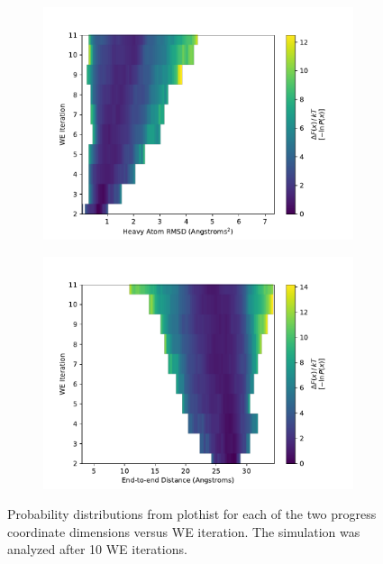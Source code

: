 \documentclass[9pt,tutorial]{livecoms}
\begin{document}
\begin{figure}
\centering
\begin{subfigure}[A]{0.22\textwidth}
\includegraphics[width=\linewidth]{Figure6A.pdf}
\end{subfigure}
\begin{subfigure}[B]{0.22\textwidth}
\includegraphics[width=\linewidth]{Figure6B.pdf}
\end{subfigure}
\caption{Probability distributions from plothist for each of the two progress coordinate dimensions versus WE iteration. 
The simulation was analyzed after 10 WE iterations.}
\label{fig:view}
\end{figure}
\end{document}
